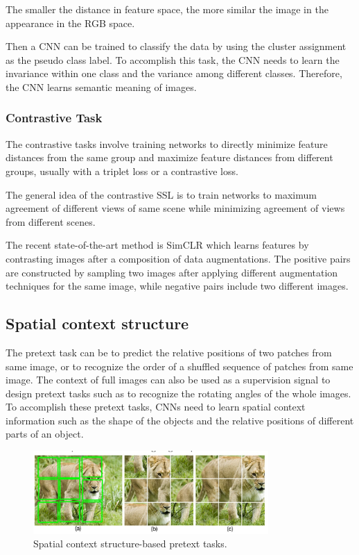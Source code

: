 The smaller the distance in feature space, the more similar the image in the
appearance in the RGB space.

Then a CNN can be trained to classify the data by using the cluster assignment
as the pseudo class label. To accomplish this task, the CNN needs to learn the
invariance within one class and the variance among different classes. Therefore,
the CNN learns semantic meaning of images.

\subsubsection{Contrastive Task}
The contrastive tasks involve training networks to directly minimize feature
distances from the same group and maximize feature distances from different groups,
usually with a triplet loss or a contrastive loss.

The general idea of the contrastive SSL is to train networks to maximum agreement
of different views of same scene while minimizing agreement of views from different
scenes.

The recent state-of-the-art method is SimCLR which learns features by contrasting
images after a composition of data augmentations. The positive pairs are
constructed by sampling two images after applying different augmentation techniques
for the same image, while negative pairs include two different images.

\subsection{Spatial context structure}
The pretext task can be to predict the relative positions of two patches from
same image, or to recognize the order of a shuffled sequence of patches from same
image. The context of full images can also be used as a supervision signal to
design pretext tasks such as to recognize the rotating angles of the whole images.
To accomplish these pretext tasks, CNNs need to learn spatial context information
such as the shape of the objects and the relative positions of different parts
of an object.

\begin{figure}[!ht]
      \centering
      \includegraphics[width=0.8\textwidth]{img/SSL/puzzle.png}
      \caption{Spatial context structure-based pretext tasks.}
      \label{fig:SCS}
\end{figure}

